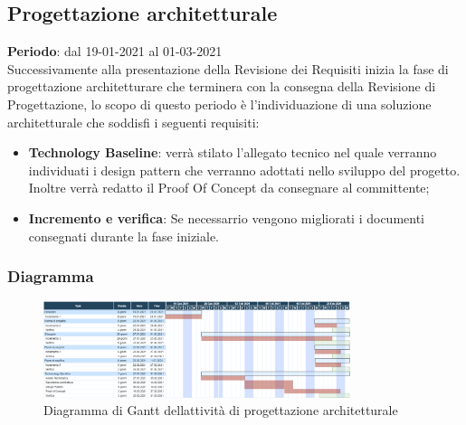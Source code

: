 	\subsection{Progettazione architetturale}
	\textbf{Periodo}: dal 19-01-2021 al 01-03-2021 \\
	Successivamente alla presentazione della Revisione dei Requisiti inizia la fase di progettazione architetturare che terminera con la consegna della Revisione di Progettazione, lo scopo di questo periodo è l'individuazione di una soluzione architetturale che soddisfi i seguenti requisiti:
	\begin{itemize}
		\item \textbf{Technology Baseline}: verrà stilato l'allegato tecnico nel quale verranno individuati i design pattern che verranno adottati nello sviluppo del progetto. Inoltre verrà redatto il Proof Of Concept da consegnare al committente;
		\item \textbf{Incremento e verifica}: Se necessarrio vengono migliorati i documenti consegnati durante la fase iniziale.
	\end{itemize}
	
	\subsubsection{Diagramma}
		\begin{figure}[H]
        		\centering
        		\includegraphics[width=0.8\textwidth]{source/img/Progettazione_architetturale.png}
        		\caption{Diagramma di Gantt dell\textquotesingle attività di progettazione architetturale}
    		\end{figure}
